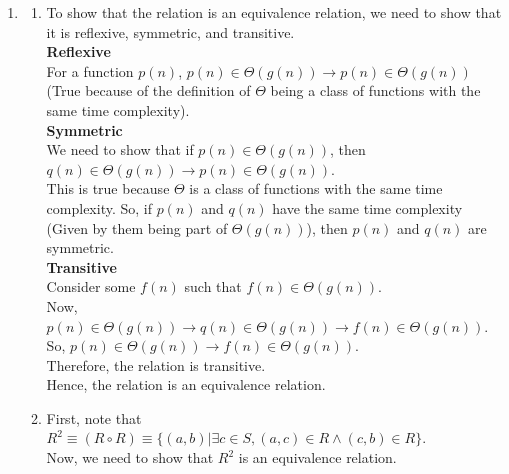 \documentclass[a4paper]{article}
\begin{document}
\begin{enumerate}
\begin{enumerate}
    \end{enumerate}


    \item \begin{enumerate}
        \item To show that the relation is an equivalence relation, we need to show that it is reflexive, symmetric, and transitive.\\

        \textbf{Reflexive}\\
        For a function $p(n)$, $p(n) \in \Theta(g(n)) \rightarrow p(n) \in \Theta(g(n))$ (True because of the definition of $\Theta$ being a class of functions with the same time complexity).\\

        \textbf{Symmetric}\\
        We need to show that if $p(n) \in \Theta(g(n))$, then $q(n) \in \Theta(g(n)) \rightarrow p(n) \in \Theta(g(n))$.\\
        This is true because $\Theta$ is a class of functions with the same time complexity. So, if $p(n)$ and $q(n)$ have the same time complexity (Given by them being part of $\Theta(g(n))$), then $p(n)$ and $q(n)$ are symmetric.\\

        \textbf{Transitive}\\
        Consider some $f(n)$ such that $f(n) \in \Theta(g(n))$.\\
        Now, $p(n) \in \Theta(g(n)) \rightarrow q(n) \in \Theta(g(n)) \rightarrow f(n) \in \Theta(g(n))$.\\
        So, $p(n) \in \Theta(g(n)) \rightarrow f(n) \in \Theta(g(n))$.\\
        Therefore, the relation is transitive.\\

        Hence, the relation is an equivalence relation.\\

        \newpage

        \item First, note that $R^2 \equiv (R \circ R) \equiv \{(a, b) | \exists c \in S, (a, c) \in R \land (c, b) \in R\}$.\\
        Now, we need to show that $R^2$ is an equivalence relation.\\


\end{enumerate}
\end{enumerate}
\end{document}
